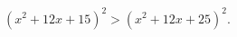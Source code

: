 \begin{ex}[type=inequality]
	\begin{condition}
		$ (x^2 + 12x + 15)^2>(x^2 + 12x + 25)^2. $
	\end{condition}
\end{ex}